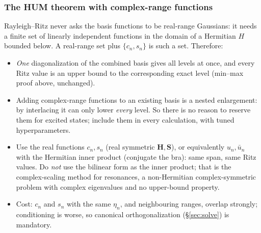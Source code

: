 \documentclass[11pt,a4paper]{article}
\numberwithin{equation}{section}
\theoremstyle{definition}
\theoremstyle{plain}
\theoremstyle{remark}
\numberwithin{algorithm}{section}
\newcommand{\mH}{\mathbf H}
\newcommand{\mS}{\mathbf S}
\begin{document}
\subsubsection{The HUM theorem with complex-range functions}
Rayleigh--Ritz never asks the basis functions to be real-range Gaussians: it needs a finite set of linearly independent functions in the domain of a Hermitian $H$ bounded below. A real-range set plus $\{c_n,s_n\}$ is such a set. Therefore:
\begin{itemize}[leftmargin=1.3em,itemsep=2pt]
\item \emph{One} diagonalization of the combined basis gives all levels at once, and every Ritz value is an upper bound to the corresponding exact level (min--max proof above, unchanged).
\item Adding complex-range functions to an existing basis is a nested enlargement: by interlacing it can only lower \emph{every} level. So there is no reason to reserve them for excited states; include them in every calculation, with tuned hyperparameters.
\item Use the real functions $c_n,s_n$ (real symmetric $\mH,\mS$), or equivalently $u_n,\bar u_n$ with the Hermitian inner product (conjugate the bra): same span, same Ritz values. Do \emph{not} use the bilinear form as the inner product; that is the complex-scaling method for resonances, a non-Hermitian complex-symmetric problem with complex eigenvalues and no upper-bound property.
\item Cost: $c_n$ and $s_n$ with the same $\eta_n$, and neighbouring ranges, overlap strongly; conditioning is worse, so canonical orthogonalization (\S\ref{sec:solve}) is mandatory.
\end{itemize}
\end{document}
